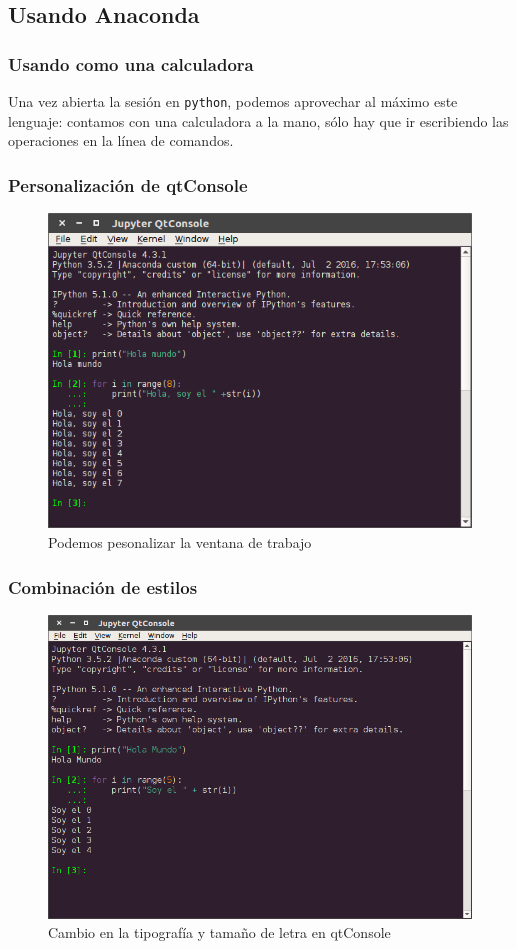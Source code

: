 {\subsection{Usando Anaconda}
\begin{frame}
\frametitle{Usando \python como una calculadora}
Una vez abierta la sesión en \texttt{python}, podemos aprovechar al máximo este lenguaje: contamos con una calculadora a la mano, sólo hay que ir escribiendo las operaciones en la línea de comandos.
\end{frame}
\begin{frame}
\frametitle{Personalización de qtConsole}
\begin{figure}
	\centering
	\includegraphics[scale=0.35]{qtConsole_02}
	\caption{Podemos pesonalizar la ventana de trabajo}
\end{figure}
\end{frame}
\begin{frame}
\frametitle{Combinación de estilos}
\begin{figure}
	\centering
	\includegraphics[scale=0.325]{qtConsole_03}
	\caption{Cambio en la tipografía y tamaño de letra en qtConsole}
\end{figure}
\end{frame}
}
